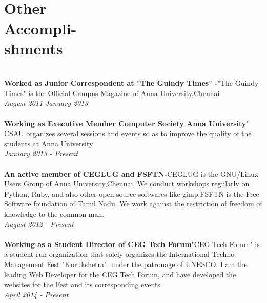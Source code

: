 \documentclass[margin,line]{resume}
\begin{document}
\begin{resume}
	 \\\\\section{\mysidestyle Other\\Accompli-\\shments}\\ 
    \textbf{Worked as Junior Correspondent at "The Guindy Times" -}"The Guindy Times" is the Official Campus Magazine of Anna University,Chennai
    \\\textsl{August 2011-January 2013}
    \\\\\textbf{Working as Executive Member Computer Society Anna University}" CSAU organizes several sessions and events so as to improve the quality of the students at Anna University
    \\\textsl{January 2013 - Present}
\\\\\textbf{An active member of CEGLUG and FSFTN-}CEGLUG is the GNU/Linux Users Group of Anna University,Chennai. We conduct workshops regularly on Python, Ruby, and also other open source softwares like gimp.FSFTN is the Free Software foundation of Tamil Nadu. We work against the restriction of freedom of knowledge to the common man. 
\\\textsl{August 2012 - Present}
    \\\\\textbf{Working as a Student Director of CEG Tech Forum}"CEG Tech Forum" is a student run organization that solely organizes the International Techno-Management Fest "Kurukshetra", under the patronage of UNESCO. I am the leading Web Developer for the CEG Tech Forum, and have developed the websites for the Fest and its corresponding events.
    \\\textsl{April 2014 - Present}


\end{resume}
\end{document}
